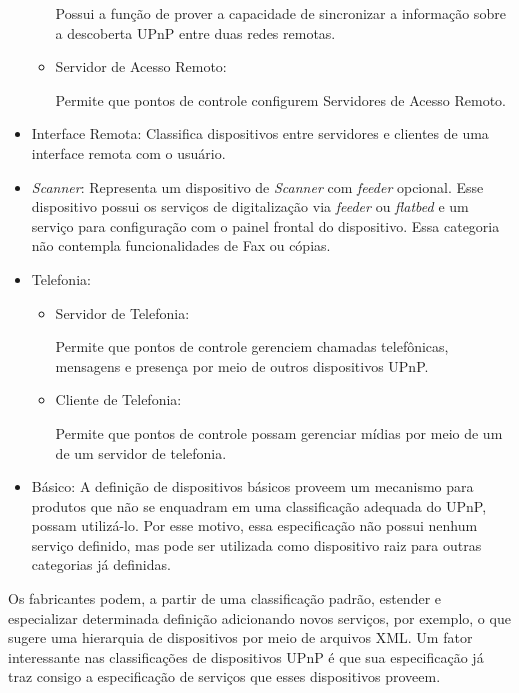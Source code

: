 \begin{itemize}
\begin{itemize}
			Possui a função de prover a capacidade de sincronizar a informação sobre a descoberta UPnP entre duas redes remotas.
		
		\item Servidor de Acesso Remoto:
		
			Permite que pontos de controle configurem Servidores de Acesso Remoto.

	\end{itemize}

\item Interface Remota:
	Classifica dispositivos entre servidores e clientes de uma interface remota com o usuário.

\item \emph{Scanner}:
	Representa um dispositivo de \emph{Scanner} com \emph{feeder} opcional. Esse dispositivo possui os serviços de digitalização via \emph{feeder} ou \emph{flatbed} e um serviço para configuração com o painel frontal do dispositivo. Essa categoria não contempla funcionalidades de Fax ou cópias.

\item Telefonia:
	\begin{itemize}
		\item Servidor de Telefonia:

			Permite que pontos de controle gerenciem chamadas telefônicas, mensagens e presença por meio de outros dispositivos UPnP. 

		\item Cliente de Telefonia:
		
			Permite que pontos de controle possam gerenciar mídias por meio de um de um servidor de telefonia.
				
	\end{itemize}

\item Básico:
	A definição de dispositivos básicos proveem um mecanismo para produtos que não se enquadram em uma classificação adequada do UPnP, possam utilizá-lo. Por esse motivo, essa especificação não possui nenhum serviço definido, mas pode ser utilizada como dispositivo raiz para outras categorias já definidas.
\end{itemize}

Os fabricantes podem, a partir de uma classificação padrão, estender e especializar determinada definição adicionando novos serviços, por exemplo, o que sugere uma hierarquia de dispositivos por meio de arquivos XML. Um fator interessante nas classificações de dispositivos UPnP é que sua especificação já traz consigo a especificação de serviços que esses dispositivos proveem. 
